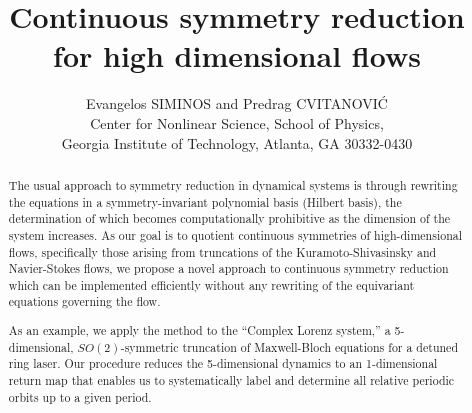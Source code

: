 \documentclass[letterpaper,10pt]{article}
\title{Continuous symmetry reduction for high dimensional flows}
\author{Evangelos SIMINOS and Predrag CVITANOVI\'C\\
Center for Nonlinear Science, School of Physics,\\
Georgia Institute of Technology, Atlanta, GA 30332-0430
}
\begin{document}
\maketitle

\begin{abstract}

The usual approach to symmetry reduction in dynamical systems is through rewriting the equations in a symmetry-invariant polynomial basis (Hilbert basis), the determination of which becomes computationally prohibitive as the dimension of the system increases. As our goal is to quotient continuous symmetries of high-dimensional flows, specifically those arising from truncations of the Kuramoto-Shivasinsky and Navier-Stokes flows, we propose a novel approach to continuous symmetry reduction which can be implemented efficiently without any rewriting of the equivariant equations governing the flow.

As an example, we apply the method to the ``Complex Lorenz system,'' a 5-dimensional, $SO(2)$-symmetric truncation of Maxwell-Bloch equations for a detuned ring laser. Our procedure reduces the 5-dimensional dynamics to an 1-dimensional return map that enables us to systematically label and determine all relative periodic orbits up to a given period. 


\end{abstract}
\end{document}
